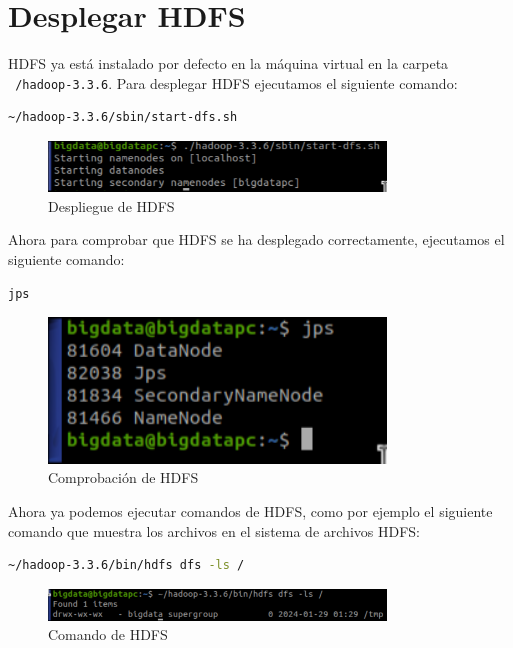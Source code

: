 \section{Desplegar HDFS}

HDFS ya está instalado por defecto en la máquina virtual en la carpeta \texttt{~/hadoop-3.3.6}. Para desplegar HDFS ejecutamos el siguiente comando:

\begin{lstlisting}[language=bash]
    ~/hadoop-3.3.6/sbin/start-dfs.sh
\end{lstlisting}

\begin{figure}[H]
    \centering
    \includegraphics[width=0.8\textwidth]{figures/6.png}
    \caption{Despliegue de HDFS}
\end{figure}

Ahora para comprobar que HDFS se ha desplegado correctamente, ejecutamos el siguiente comando:

\begin{lstlisting}[language=bash]
    jps
\end{lstlisting}

\begin{figure}[H]
    \centering
    \includegraphics[width=0.8\textwidth]{figures/7.png}
    \caption{Comprobación de HDFS}
\end{figure}

Ahora ya podemos ejecutar comandos de HDFS, como por ejemplo el siguiente comando que muestra los archivos en el sistema de archivos HDFS:

\begin{lstlisting}[language=bash]
    ~/hadoop-3.3.6/bin/hdfs dfs -ls /
\end{lstlisting}

\begin{figure}[H]
    \centering
    \includegraphics[width=0.8\textwidth]{figures/8.png}
    \caption{Comando de HDFS}
\end{figure}

